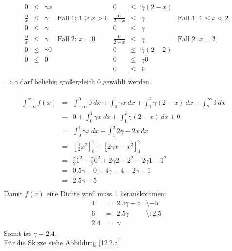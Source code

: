 \documentclass[twoside]{article}
\begin{document}
\sss
\[
    \begin{array}{rll|l||rll|l}
    0&\leq&\gamma x&&0&\leq&\gamma(2-x)&\\
    \frac{0}{x}&\leq&\gamma&\text{Fall 1: }1\geq x>0&\frac{0}{2-x}&\leq&\gamma&\text{Fall 1: }1\leq x<2\\
    0&\leq&\gamma&&0&\leq&\gamma&\\
    \frac{0}{x}&\leq&\gamma&\text{Fall 2: }x=0&\frac{0}{2-x}&\leq&\gamma&\text{Fall 2: }x=2\\
    0&\leq&\gamma 0&&0&\leq&\gamma(2-2)&\\
    0&\leq&0&&0&\leq&\gamma0&\\
    &&&&0&\leq&0&\\
    \end{array}
\]
$\Rightarrow \gamma$ darf beliebig größergleich $0$ gewählt werden.\\
\\
\[
    \begin{array}{rlll}
        \int_{-\infty}^{\infty}f(x)&=&\int_{-\infty}^{0}0~dx+\int_{0}^{1}\gamma x~dx+\int_{1}^{2}\gamma(2-x)~dx+\int_{2}^{\infty}0~dx&\\
        &=&0+\int_{0}^{1}\gamma x~dx+\int_{1}^{2}\gamma(2-x)~dx+0&\\
        &=&\int_{0}^{1}\gamma x~dx+\int_{1}^{2}2\gamma-2x~dx&\\
        &=&\left[\frac{\gamma}{2} x^2\right]_0^1+\left[2\gamma x -x^2\right]_{1}^{2}&\\
        &=&\frac{\gamma}{2}1^2-\frac{\gamma}{2}0^2+2\gamma 2 -2^2-2\gamma 1 -1^2&\\
        &=&0.5\gamma-0+4\gamma-4-2\gamma-1&\\
        &=&2.5\gamma-5&\\
    \end{array}
\]
Damit $f(x)$ eine Dichte wird muss $1$ herauskommen:
\[
    \begin{array}{rlll}
        1&=&2.5\gamma-5&\text{\textbackslash $+5$}\\
        6&=&2.5\gamma&\text{\textbackslash $:2.5$}\\
        2.4&=&\gamma&
    \end{array}
\]
Somit ist $\gamma=2.4$.\\
Für die Skizze siehe Abbildung \ref{12.2.a}
\end{document}
